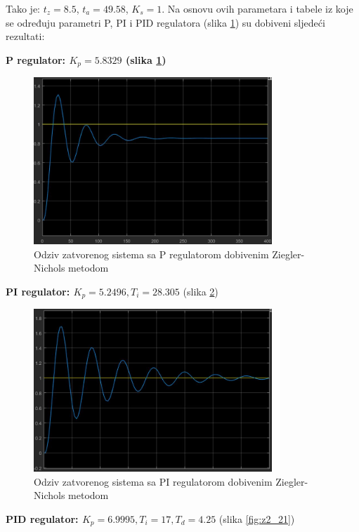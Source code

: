 Tako je: $t_z=8.5$, $t_a=49.58$, $K_s=1$. Na osnovu ovih parametara i tabele iz koje se određuju parametri P, PI i PID regulatora (slika \ref{fig:z2_19}) su dobiveni sljedeći rezultati:

\textbf{P regulator: $K_p=5.8329$ (slika \ref{fig:z2_19})}
 
\begin{figure} [H]
  \centering
  \includegraphics[width=0.8\textwidth]{z2_19}
  \caption{Odziv zatvorenog sistema sa P regulatorom dobivenim Ziegler-Nichols metodom}
  \label{fig:z2_19}
\end{figure}

\textbf{PI regulator: $K_p=5.2496, T_i=28.305$} (slika \ref{fig:z2_20})
 
\begin{figure} [H]
  \centering
  \includegraphics[width=0.8\textwidth]{z2_20}
  \caption{Odziv zatvorenog sistema sa PI regulatorom dobivenim Ziegler-Nichols metodom}
  \label{fig:z2_20}
\end{figure}

\textbf{PID regulator: $K_p=6.9995, T_i=17, T_d=4.25$} (slika \ref{fig:z2_21})

